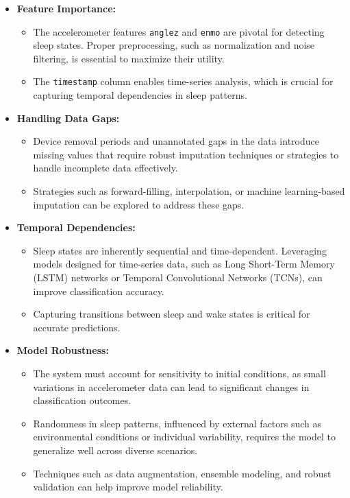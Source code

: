 \documentclass[conference]{IEEEtran}
\begin{document}
\begin{itemize}
	\item \textbf{Feature Importance:}
	      \begin{itemize}
		      \item The accelerometer features \texttt{anglez} and \texttt{enmo} are pivotal for detecting sleep states. Proper preprocessing, such as normalization and noise filtering, is essential to maximize their utility.
		      \item The \texttt{timestamp} column enables time-series analysis, which is crucial for capturing temporal dependencies in sleep patterns.
	      \end{itemize}

	\item \textbf{Handling Data Gaps:}
	      \begin{itemize}
		      \item Device removal periods and unannotated gaps in the data introduce missing values that require robust imputation techniques or strategies to handle incomplete data effectively.
		      \item Strategies such as forward-filling, interpolation, or machine learning-based imputation can be explored to address these gaps.
	      \end{itemize}

	\item \textbf{Temporal Dependencies:}
	      \begin{itemize}
		      \item Sleep states are inherently sequential and time-dependent. Leveraging models designed for time-series data, such as Long Short-Term Memory (LSTM) networks or Temporal Convolutional Networks (TCNs), can improve classification accuracy.
		      \item Capturing transitions between sleep and wake states is critical for accurate predictions.
	      \end{itemize}

	\item \textbf{Model Robustness:}
	      \begin{itemize}
		      \item The system must account for sensitivity to initial conditions, as small variations in accelerometer data can lead to significant changes in classification outcomes.
		      \item Randomness in sleep patterns, influenced by external factors such as environmental conditions or individual variability, requires the model to generalize well across diverse scenarios.
		      \item Techniques such as data augmentation, ensemble modeling, and robust validation can help improve model reliability.
	      \end{itemize}


\end{itemize}
\end{document}
